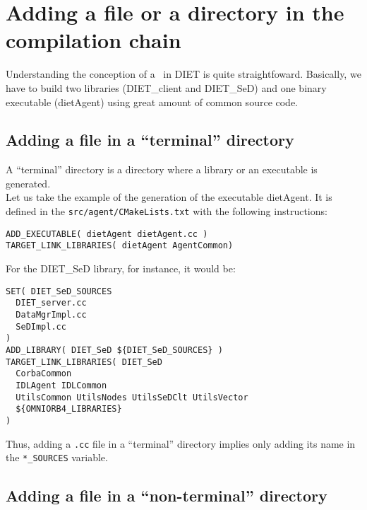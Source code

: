 \section{Adding a file or a directory in the compilation chain}


Understanding the conception of a \CMakeLists\ in DIET is quite
straightfoward.
Basically, we have to build two libraries (\textsf{DIET\_client}
and \textsf{DIET\_SeD}) and one binary executable (\textsf{dietAgent})
using great amount of common source code.

\subsection{Adding a file in a ``terminal'' directory}

A ``terminal'' directory is a directory where a library or an
executable is generated.\\

Let us take the example of the generation of the executable
\textsf{dietAgent}.
It is defined in the \texttt{src/agent/CMakeLists.txt}
with the following \cmake instructions:
\begin{verbatim}
ADD_EXECUTABLE( dietAgent dietAgent.cc )
TARGET_LINK_LIBRARIES( dietAgent AgentCommon)
\end{verbatim}

For the \textsf{DIET\_SeD} library, for instance, it would be:
\begin{verbatim}
SET( DIET_SeD_SOURCES
  DIET_server.cc
  DataMgrImpl.cc
  SeDImpl.cc
)
ADD_LIBRARY( DIET_SeD ${DIET_SeD_SOURCES} )
TARGET_LINK_LIBRARIES( DIET_SeD
  CorbaCommon
  IDLAgent IDLCommon
  UtilsCommon UtilsNodes UtilsSeDClt UtilsVector
  ${OMNIORB4_LIBRARIES}
)
\end{verbatim}

Thus, adding a \texttt{.cc} file in a ``terminal'' directory implies
only adding its name in the \texttt{*\_SOURCES} variable.

\subsection{Adding a file in a ``non-terminal'' directory}

